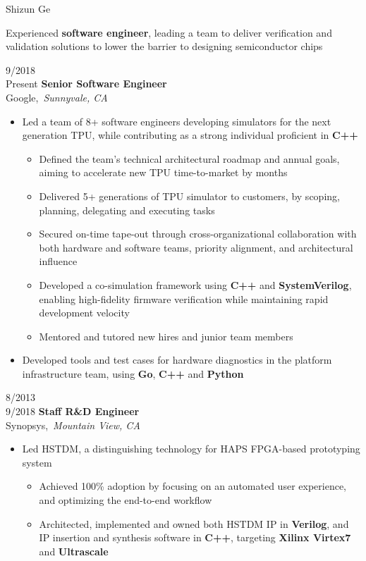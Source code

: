 \documentclass[10pt,letter]{article}
\newcommand{\headerRight}[1]{
  \tcbsubtitle[halign upper=flush left]{\bf\LARGE\textsc{#1}}
}
\newcommand{\kw}[1]{{\bf{#1}}}
\newcommand{\job}[6]{
  \begin{rightColumnTwoBoxes}
    {#2}\\{#3}
  \tcblower
    {\bf {#1}}\\
    {{#4}},\ {\it {#5}}
    {#6}
  \end{rightColumnTwoBoxes}
}
\begin{document}
\begin{resume}{Shizun Ge}
\tcblower
  \headerRight{Summary}
    Experienced \kw{software engineer}, leading a team to deliver verification and validation solutions to lower the barrier to designing semiconductor chips

  \headerRight{Experience}
    \job{Senior Software Engineer}{9/2018}{Present}{Google}{Sunnyvale, CA}{
      \begin{itemize}
        \item Led a team of 8+ software engineers developing simulators for the next generation TPU, while contributing as a strong individual proficient in \kw{C++}
        \begin{itemize}
          \item Defined the team's technical architectural roadmap and annual goals, aiming to accelerate new TPU time-to-market by months
          \item Delivered 5+ generations of TPU simulator to customers, by scoping, planning, delegating and executing tasks
          \item Secured on-time tape-out through cross-organizational collaboration with both hardware and software teams, priority alignment, and architectural influence
          \item Developed a co-simulation framework using \kw{C++} and \kw{SystemVerilog}, enabling high-fidelity firmware verification while maintaining rapid development velocity
          \item Mentored and tutored new hires and junior team members
        \end{itemize}
        \item Developed tools and test cases for hardware diagnostics in the platform infrastructure team, using \kw{Go}, \kw{C++} and \kw{Python}
      \end{itemize}
    }
    \job{Staff R\&D Engineer}{8/2013}{9/2018}{Synopsys}{Mountain View, CA}{
      \begin{itemize}
        \item Led HSTDM, a distinguishing technology for HAPS FPGA-based prototyping system
        \begin{itemize}
          \item Achieved 100\% adoption by focusing on an automated user experience, and optimizing the end-to-end workflow
          \item Architected, implemented and owned both HSTDM IP in \kw{Verilog}, and IP insertion and synthesis software in \kw{C++}, targeting \kw{Xilinx Virtex7} and \kw{Ultrascale}

\end{itemize}
\end{itemize}}
\end{resume}
\end{document}
